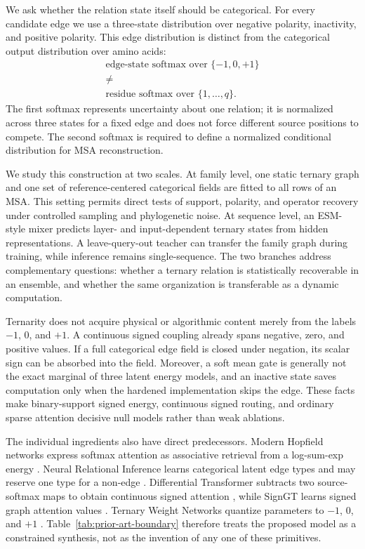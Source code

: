 \documentclass[10pt,twocolumn]{article}
\newcommand{\1}{\mathbf 1}
\theoremstyle{remark}
\begin{document}
We ask whether the relation state itself should be categorical.  For every candidate edge we use a
three-state distribution over negative polarity, inactivity, and positive polarity.  This edge
distribution is distinct from the categorical output distribution over amino acids:
\begin{equation}
\boxed{
\begin{gathered}
\text{edge-state softmax over }\{-1,0,+1\}\\
\neq\\[-2pt]
\text{residue softmax over }\{1,\ldots,q\}.
\end{gathered}}
\label{eq:two-softmaxes}
\end{equation}
The first softmax represents uncertainty about one relation; it is normalized across three states
for a fixed edge and does not force different source positions to compete.  The second softmax is
required to define a normalized conditional distribution for MSA reconstruction.

We study this construction at two scales.  At family level, one static ternary graph and one set of
reference-centered categorical fields are fitted to all rows of an MSA.  This setting permits direct
tests of support, polarity, and operator recovery under controlled sampling and phylogenetic
noise.  At sequence level, an ESM-style mixer predicts layer- and input-dependent ternary states
from hidden representations.  A leave-query-out teacher can transfer the family graph during
training, while inference remains single-sequence.  The two branches address complementary
questions: whether a ternary relation is statistically recoverable in an ensemble, and whether the
same organization is transferable as a dynamic computation.

Ternarity does not acquire physical or algorithmic content merely from the labels $-1$, $0$, and
$+1$.  A continuous signed coupling already spans negative, zero, and positive values.  If a full
categorical edge field is closed under negation, its scalar sign can be absorbed into the field.
Moreover, a soft mean gate is generally not the exact marginal of three latent energy models, and
an inactive state saves computation only when the hardened implementation skips the edge.  These
facts make binary-support signed energy, continuous signed routing, and ordinary sparse attention
decisive null models rather than weak ablations.

The individual ingredients also have direct predecessors.  Modern Hopfield networks express
softmax attention as associative retrieval from a log-sum-exp energy \cite{ramsauer2021}.  Neural Relational Inference learns
categorical latent edge types and may reserve one type for a non-edge \cite{kipf2018}.  Differential
Transformer subtracts two source-softmax maps to obtain continuous signed attention \cite{ye2024},
while SignGT learns signed graph attention values \cite{chen2026}.  Ternary Weight Networks
quantize parameters to $-1$, $0$, and $+1$ \cite{li2016}.  Table~\ref{tab:prior-art-boundary}
therefore treats the proposed model as a constrained synthesis, not as the invention of any one of
these primitives.
\end{document}
